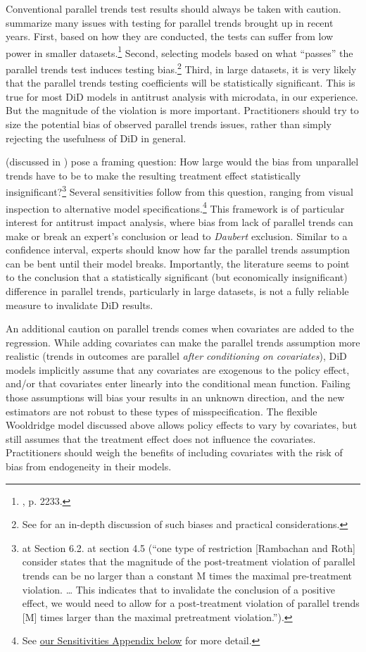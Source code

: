 \documentclass[12pt]{article}
\begin{document}
Conventional parallel trends test results should always be taken with caution. \citet{roth2023s} summarize many issues with testing for parallel trends brought up in recent years. First, based on how they are conducted, the tests can suffer from low power in smaller datasets.\footnote{\citet{roth2023s}, p. 2233.}  Second, selecting models based on what “passes” the parallel trends test induces testing bias.\footnote{See \citet{roth2022a} for an in-depth discussion of such biases and practical considerations.}  Third, in large datasets, it is very likely that the parallel trends testing coefficients will be statistically significant. This is true for most DiD models in antitrust analysis with microdata, in our experience. But the magnitude of the violation is more important. Practitioners should try to size the potential bias of observed parallel trends issues, rather than simply rejecting the usefulness of DiD in general. 

\citet{rambachan2023more} (discussed in \citet{roth2023s}) pose a framing question: How large would the bias from unparallel trends have to be to make the resulting treatment effect statistically insignificant?\footnote{\citet{rambachan2023more} at Section 6.2. \citet{roth2023s} at section 4.5 (“one type of restriction [Rambachan and Roth] consider states that the magnitude of the post-treatment violation of parallel trends can be no larger than a constant M times the maximal pre-treatment violation. … This indicates that to invalidate the conclusion of a positive effect, we would need to allow for a post-treatment violation of parallel trends [M] times larger than the maximal pretreatment violation.”).}  Several sensitivities follow from this question, ranging from visual inspection to alternative model specifications.\footnote{See \hyperref[sec:appendixa]{our Sensitivities Appendix below} for more detail.}  This framework is of particular interest for antitrust impact analysis, where bias from lack of parallel trends can make or break an expert’s conclusion or lead to \textit{Daubert} exclusion. Similar to a confidence interval, experts should know how far the parallel trends assumption can be bent until their model breaks. Importantly, the literature seems to point to the conclusion that a statistically significant (but economically insignificant) difference in parallel trends, particularly in large datasets, is not a fully reliable measure to invalidate DiD results.

An additional caution on parallel trends comes when covariates are added to the regression. While adding covariates can make the parallel trends assumption more realistic (trends in outcomes are parallel \textit{after conditioning on covariates}), DiD models implicitly assume that any covariates are exogenous to the policy effect, and/or that covariates enter linearly into the conditional mean function. Failing those assumptions will bias your results in an unknown direction, and the new estimators are not robust to these types of misspecification. The flexible Wooldridge model discussed above allows policy effects to vary by covariates, but still assumes that the treatment effect does not influence the covariates. Practitioners should weigh the benefits of including covariates with the risk of bias from endogeneity in their models.
\end{document}
